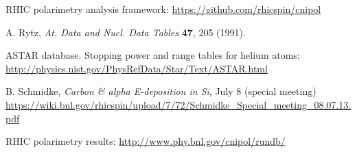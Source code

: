 \documentclass[a4paper,12pt]{article}
\begin{document}
\clearpage
\begin{thebibliography}{9} %

RHIC polarimetry analysis framework: \url{https://github.com/rhicspin/cnipol}

A. Rytz, \emph{At. Data and Nucl. Data Tables} \textbf{47}, 205 (1991).

ASTAR database. Stopping power and range tables for helium atoms:
\url{http://physics.nist.gov/PhysRefData/Star/Text/ASTAR.html}

B. Schmidke,
\emph{Carbon \& alpha E-deposition in Si}, July 8 (special meeting)
\url{https://wiki.bnl.gov/rhicspin/upload/7/72/Schmidke_Special_meeting_08.07.13.pdf}

RHIC polarimetry results: \url{http://www.phy.bnl.gov/cnipol/rundb/}

\end{thebibliography}
\end{document}
